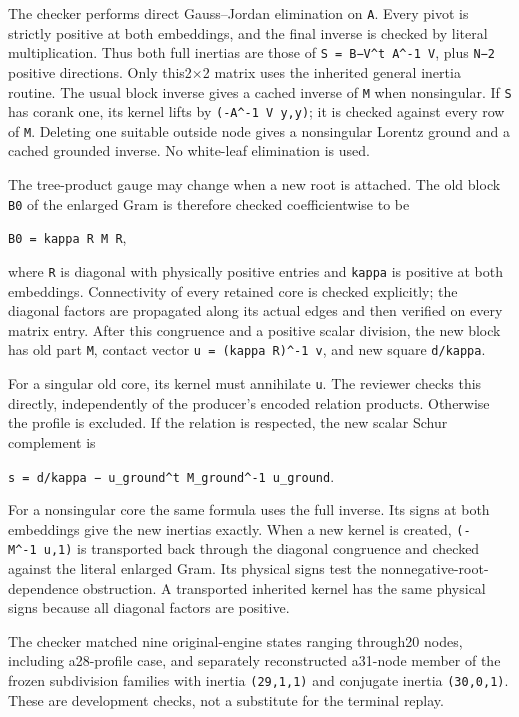 \documentclass[
  10pt,
]{report}
\begin{document}
The checker performs direct Gauss--Jordan elimination on \texttt{A}.
Every pivot is strictly positive at both embeddings, and the final
inverse is checked by literal multiplication. Thus both full inertias
are those of \texttt{S\ =\ B−V\^{}t\ A\^{}-1\ V}, plus \texttt{N−2}
positive directions. Only this2×2 matrix uses the inherited general
inertia routine. The usual block inverse gives a cached inverse of
\texttt{M} when nonsingular. If \texttt{S} has corank one, its kernel
lifts by \texttt{(-A\^{}-1\ V\ y,y)}; it is checked against every row of
\texttt{M}. Deleting one suitable outside node gives a nonsingular
Lorentz ground and a cached grounded inverse. No white-leaf elimination
is used.

The tree-product gauge may change when a new root is attached. The old
block \texttt{B0} of the enlarged Gram is therefore checked
coefficientwise to be

\texttt{B0\ =\ kappa\ R\ M\ R},

where \texttt{R} is diagonal with physically positive entries and
\texttt{kappa} is positive at both embeddings. Connectivity of every
retained core is checked explicitly; the diagonal factors are propagated
along its actual edges and then verified on every matrix entry. After
this congruence and a positive scalar division, the new block has old
part \texttt{M}, contact vector \texttt{u\ =\ (kappa\ R)\^{}-1\ v}, and
new square \texttt{d/kappa}.

For a singular old core, its kernel must annihilate \texttt{u}. The
reviewer checks this directly, independently of the producer's encoded
relation products. Otherwise the profile is excluded. If the relation is
respected, the new scalar Schur complement is

\texttt{s\ =\ d/kappa\ −\ u\_ground\^{}t\ M\_ground\^{}-1\ u\_ground}.

For a nonsingular core the same formula uses the full inverse. Its signs
at both embeddings give the new inertias exactly. When a new kernel is
created, \texttt{(-M\^{}-1\ u,1)} is transported back through the
diagonal congruence and checked against the literal enlarged Gram. Its
physical signs test the nonnegative-root-dependence obstruction. A
transported inherited kernel has the same physical signs because all
diagonal factors are positive.

The checker matched nine original-engine states ranging through20 nodes,
including a28-profile case, and separately reconstructed a31-node member
of the frozen subdivision families with inertia \texttt{(29,1,1)} and
conjugate inertia \texttt{(30,0,1)}. These are development checks, not a
substitute for the terminal replay.
\end{document}
